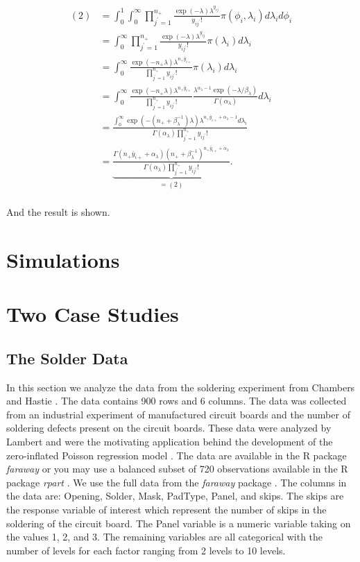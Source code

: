 \documentclass{article}
\begin{document}
 \begin{align*}
 (2) &= \int_0^1\int_0^\infty\prod_{j^\prime=1}^{n_+}\frac{\exp{(-\lambda)}\lambda^{y_{ij^\prime}} }{y_{ij^\prime}!}\pi(\phi_i,\lambda_i )d\lambda_id\phi_i \\
 &= \int_0^\infty \prod_{j^\prime=1}^{n_+}\frac{\exp{(-\lambda)}\lambda^{y_{ij^\prime}} }{y_{ij^\prime}!}\pi(\lambda_i )d\lambda_i \\
 &= \int_0^\infty\frac{\exp{(-n_+\lambda)}\lambda^{n_+\bar{y}_{i+}} }{\prod_{j^\prime=1}^{n_+}y_{ij^\prime}!}\pi(\lambda_i )d\lambda_i \\
 &= \int_0^\infty\frac{\exp{(-n_+\lambda)}\lambda^{n_+\bar{y}_{i+}} }{\prod_{j^\prime=1}^{n_+}y_{ij^\prime}!}\frac{\lambda^{\alpha_{\lambda}-1}\exp{(-\lambda/\beta_{\lambda})}}{\Gamma(\alpha_{\lambda})}d\lambda_i \\
 &= \frac{\int_0^\infty\exp{(-(n_+ +\beta_{\lambda}^{-1})\lambda)}\lambda^{n_+\bar{y}_{i+} +\alpha_{\lambda}-1} d\lambda_i}{\Gamma(\alpha_{\lambda})\prod_{j^\prime=1}^{n_+}y_{ij^\prime}!} \\
 &= \underbrace{\frac{\Gamma(n_+\bar{y}_{i+}+\alpha_{\lambda})(n_+ +\beta_{\lambda}^{-1})^{n_+\bar{y}_{i+}+\alpha_{\lambda}}}{\Gamma(\alpha_{\lambda})\prod_{j^\prime=1}^{n_+}y_{ij^\prime}!}}_{=(2)}. \\
 \end{align*}
 
 And the result is shown. 

\section{Simulations}
\label{sec:simulations}

\section{Two Case Studies}
\label{sec:twocasestudies}

\subsection{The Solder Data}
In this section we analyze the data from the soldering experiment from Chambers and Hastie \cite{chambers1991statistical}. The data contains 900 rows and 6 columns. The data was collected from an industrial experiment of manufactured circuit boards and the number of soldering defects present on the circuit boards. These data were analyzed by Lambert and were the motivating application behind the development of the zero-inflated Poisson regression model \cite{lambert1992zero}. The data are available in the R package \emph{faraway} or you may use a balanced subset of 720 observations available in the R package \emph{rpart} \cite{2015rpart}. We use the full data from the \emph{faraway} package \cite{faraway2016Rpack}. The columns in the data are:
Opening, Solder, Mask, PadType, Panel, and skips. The skips are the response variable of interest which represent the number of skips in the soldering of the circuit board. The Panel variable is a numeric variable taking on the values 1, 2, and 3. The remaining variables are all categorical with the number of levels for each factor ranging from 2 levels to 10 levels. 
\end{document}
